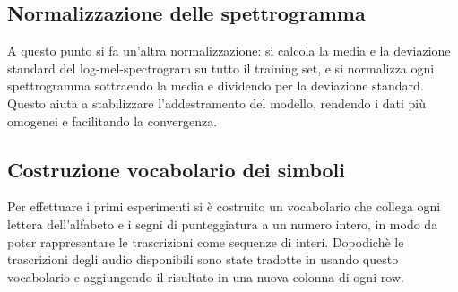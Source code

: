 \documentclass[12pt, a4paper]{article}
\begin{document}
\subsection{Normalizzazione delle spettrogramma}
A questo punto si fa un'altra normalizzazione: si calcola la media e la deviazione standard del log-mel-spectrogram su tutto il training set, e si normalizza ogni spettrogramma sottraendo la media e dividendo per la deviazione standard. Questo aiuta a stabilizzare l'addestramento del modello, rendendo i dati più omogenei e facilitando la convergenza.

\subsection{Costruzione vocabolario dei simboli}
Per effettuare i primi esperimenti si è costruito un vocabolario che collega ogni lettera dell'alfabeto e i segni di punteggiatura a un numero intero, in modo da poter rappresentare le trascrizioni come sequenze di interi. Dopodichè le trascrizioni degli audio disponibili sono state tradotte in usando questo vocabolario e aggiungendo il risultato in una nuova colonna di ogni row.
\end{document}
